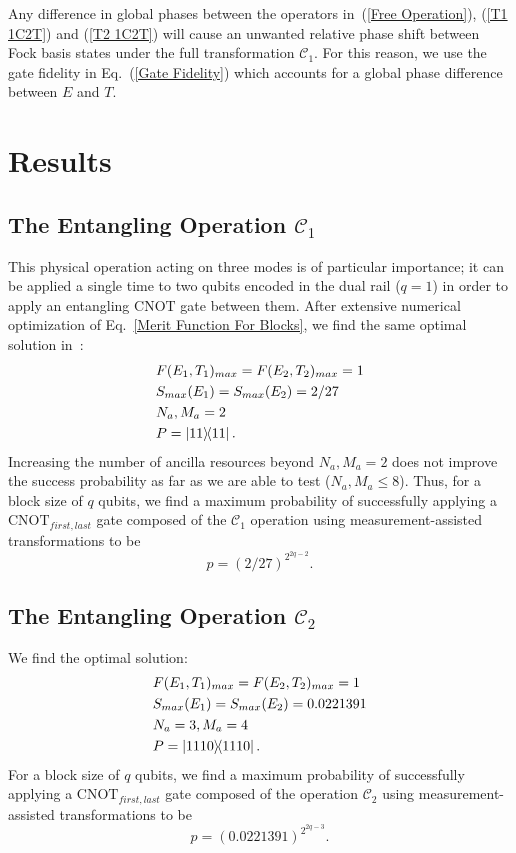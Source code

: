 \documentclass[aps,pra,twocolumn,showpacs,superscriptaddress,floatfix,10pt]{revtex4}
\begin{document}
Any difference in global phases between the operators in~(\ref{Free Operation}), (\ref{T1 1C2T}) and (\ref{T2 1C2T}) will cause an unwanted relative phase shift between Fock basis states under the full transformation $\mathcal{C}_1$. For this reason, we use the gate fidelity in Eq.~(\ref{Gate Fidelity}) which accounts for a global phase difference between $E$ and $T$. 
\section{Results}
\subsection{The Entangling Operation $\mathcal{C}_1$}
This physical operation acting on three modes is of particular importance; it can be applied a single time to two qubits encoded in the dual rail ($q=1$) in order to apply an entangling $\mbox{CNOT}$ gate between them. After extensive numerical optimization of Eq.~\ref{Merit Function For Blocks}, we find the same optimal solution in~\cite{Uskov}:
\begin{eqnarray}
& F(E_1,T_1)_{max} = F(E_2,T_2)_{max} = 1 \nonumber \\
& S_{max}(E_1) = S_{max}(E_2) = 2/27 \\
& N_a,M_a=2 \nonumber \\
& P = \outerproduct{11}{11} \nonumber	.
\end{eqnarray}
Increasing the number of ancilla resources beyond $N_a,M_a=2$ does not improve the success probability as far as we are able to test ($N_a,M_a \le 8$). Thus, for a block size of $q$ qubits, we find a maximum probability of successfully applying a $\mbox{CNOT}_{first,last}$ gate composed of the $\mathcal{C}_1$ operation using measurement-assisted transformations to be
\begin{equation}
\label{1C2T Result}
p = (2/27)^{2^{2q-2}}.
\end{equation}
\subsection{The Entangling Operation $\mathcal{C}_2$}
We find the optimal solution:
\begin{eqnarray}
& F(E_1,T_1)_{max} = F(E_2,T_2)_{max} = 1 \nonumber \\
&S_{max}(E_1) = S_{max}(E_2) = 0.0221391 \\
&N_a = 3,M_a=4 \nonumber \\
&P = \outerproduct{1110}{1110} \nonumber	.
\end{eqnarray}
For a block size of $q$ qubits, we find a maximum probability of successfully applying a $\mbox{CNOT}_{first,last}$ gate composed of the operation $\mathcal{C}_2$ using measurement-assisted transformations to be
\begin{equation}
\label{2C2T Result}
p = (0.0221391)^{2^{2q-3}}.
\end{equation}
\end{document}
